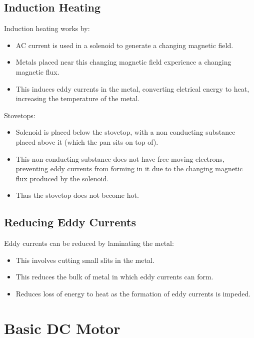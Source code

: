 \documentclass[a4paper,11pt]{article}
\begin{document}
\subsection{Induction Heating}

Induction heating works by:

\begin{itemize}
\item AC current is used in a solenoid to generate a changing magnetic field.
\item Metals placed near this changing magnetic field experience a changing
	magnetic flux.
\item This induces eddy currents in the metal, converting eletrical energy to
	heat, increasing the temperature of the metal.
\end{itemize}

Stovetops:

\begin{itemize}
\item Solenoid is placed below the stovetop, with a non conducting substance
	placed above it (which the pan sits on top of).
\item This non-conducting substance does not have free moving electrons,
	preventing eddy currents from forming in it due to the changing magnetic
	flux produced by the solenoid.
\item Thus the stovetop does not become hot.
\end{itemize}


\subsection{Reducing Eddy Currents}

Eddy currents can be reduced by laminating the metal:

\begin{itemize}
\item This involves cutting small slits in the metal.
\item This reduces the bulk of metal in which eddy currents can form.
\item Reduces loss of energy to heat as the formation of eddy currents is
	impeded.
\end{itemize}




\section{Basic DC Motor}
\end{document}
